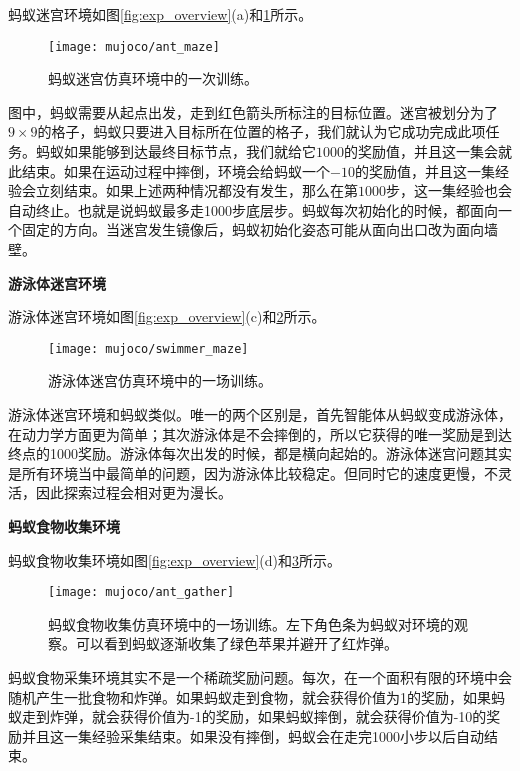 蚂蚁迷宫环境如图\ref{fig:exp_overview}(a)和\ref{fig:ant_maze}所示。

\begin{figure}[h]
    \centering
    \texttt{[image: mujoco/ant\_maze]}
    \caption{蚂蚁迷宫仿真环境中的一次训练。}
    \label{fig:ant_maze}
\end{figure}
图中，蚂蚁需要从起点出发，走到红色箭头所标注的目标位置。迷宫被划分为了$9 \times 9$的格子，蚂蚁只要进入目标所在位置的格子，我们就认为它成功完成此项任务。蚂蚁如果能够到达最终目标节点，我们就给它$1000$的奖励值，并且这一集会就此结束。如果在运动过程中摔倒，环境会给蚂蚁一个$-10$的奖励值，并且这一集经验会立刻结束。如果上述两种情况都没有发生，那么在第$1000$步，这一集经验也会自动终止。也就是说蚂蚁最多走1000步底层步。蚂蚁每次初始化的时候，都面向一个固定的方向。当迷宫发生镜像后，蚂蚁初始化姿态可能从面向出口改为面向墙壁。

\vspace{0.5cm}
\textbf{游泳体迷宫环境}

游泳体迷宫环境如图\ref{fig:exp_overview}(c)和\ref{fig:swimmer_maze}所示。

\begin{figure}[h]
    \centering
    \texttt{[image: mujoco/swimmer\_maze]}
    \caption{游泳体迷宫仿真环境中的一场训练。}
    \label{fig:swimmer_maze}
\end{figure}
游泳体迷宫环境和蚂蚁类似。唯一的两个区别是，首先智能体从蚂蚁变成游泳体，在动力学方面更为简单；其次游泳体是不会摔倒的，所以它获得的唯一奖励是到达终点的1000奖励。游泳体每次出发的时候，都是横向起始的。游泳体迷宫问题其实是所有环境当中最简单的问题，因为游泳体比较稳定。但同时它的速度更慢，不灵活，因此探索过程会相对更为漫长。

\vspace{0.5cm}
\textbf{蚂蚁食物收集环境}

蚂蚁食物收集环境如图\ref{fig:exp_overview}(d)和\ref{fig:ant_gather}所示。

\begin{figure}[H]
    \centering
    \texttt{[image: mujoco/ant\_gather]}
    \caption{蚂蚁食物收集仿真环境中的一场训练。左下角色条为蚂蚁对环境的观察。可以看到蚂蚁逐渐收集了绿色苹果并避开了红炸弹。}
    \label{fig:ant_gather}
\end{figure}
蚂蚁食物采集环境其实不是一个稀疏奖励问题。每次，在一个面积有限的环境中会随机产生一批食物和炸弹。如果蚂蚁走到食物，就会获得价值为1的奖励，如果蚂蚁走到炸弹，就会获得价值为-1的奖励，如果蚂蚁摔倒，就会获得价值为-10的奖励并且这一集经验采集结束。如果没有摔倒，蚂蚁会在走完1000小步以后自动结束。

